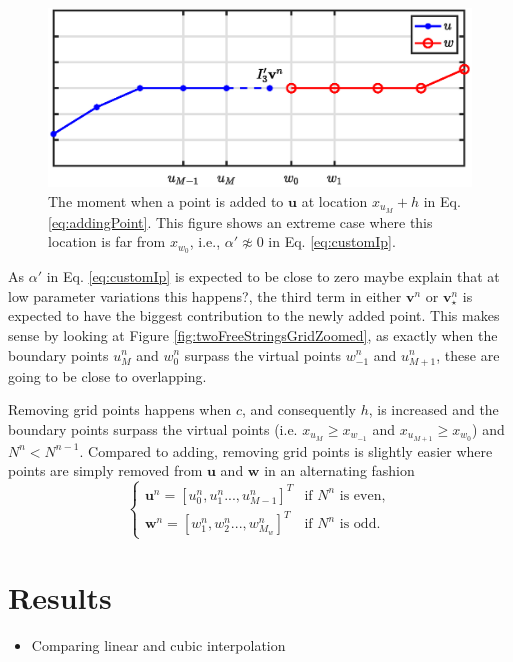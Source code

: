 \documentclass[dvipsnames, reprint]{JASA}
\def\SWcomment[#1]{\textcolor{Bittersweet}{#1}}
\begin{document}
\begin{figure}[h]
\includegraphics[width=\reprintcolumnwidth]{addingGridPoint}
\caption{\label{fig:addingPoint}{The moment when a point is added to $\mathbf{u}$ at location $x_{u_M} + h$ in Eq. \eqref{eq:addingPoint}. This figure shows an extreme case where this location is far from $x_{w_0}$, i.e., $\alpha' \not\approx 0$ in Eq. \eqref{eq:customIp}.}}
\end{figure} 

As $\alpha'$ in Eq. \eqref{eq:customIp} is expected to be close to zero \SWcomment[maybe explain that at low parameter variations this happens?], the third term in either $\mathbf{v}^n$ or $\mathbf{v}_\star^n$ is expected to have the biggest contribution to the newly added point. This makes sense by looking at Figure \ref{fig:twoFreeStringsGridZoomed}, as exactly when the boundary points $u_M^n$ and $w_0^n$ surpass the virtual points $w_{-1}^n$ and $u_{M+1}^n$, these are going to be close to overlapping.

Removing grid points happens when $c$, and consequently $h$, is increased and the boundary points surpass the virtual points (i.e. $x_{u_M} \geq x_{w_{-1}}$ and $x_{u_{M+1}} \geq x_{w_0}$) and $N^n < N^{n-1}$. Compared to adding, removing grid points is slightly easier where points are simply removed from $\mathbf{u}$ and $\mathbf{w}$ in an alternating fashion
\begin{equation}\label{eq:addingPoint}
\begin{cases}
    \mathbf{u}^n = [u_0^n, u_1^n ..., u_{M-1}^n]^T & \text{if $N^n$ is even}, \\
     \mathbf{w}^n = [w_1^n, w_2^n ..., w_{M_w}^n]^T & \text{if $N^n$ is odd}.
    \end{cases}
\end{equation}


\section{Results}\label{sec:results}
\begin{itemize}
    \item Comparing linear and cubic interpolation
\end{itemize}
\end{document}
